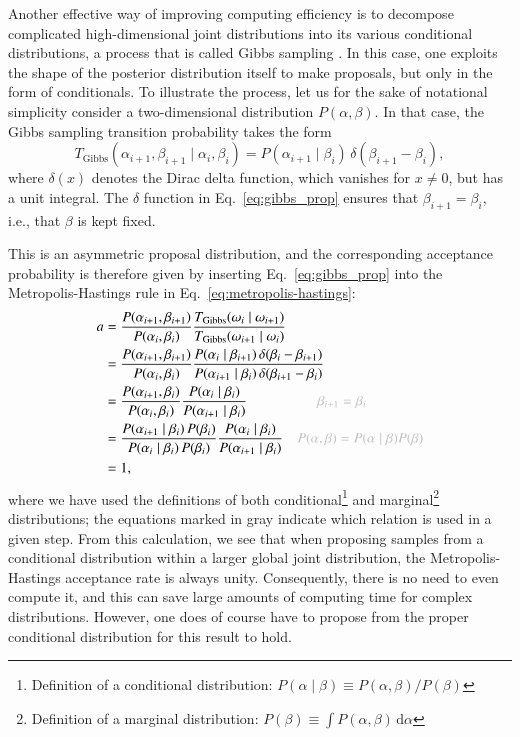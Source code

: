 \documentclass[twocolumn]{aa}
\begin{document}
Another effective way of improving computing efficiency is to decompose
complicated high-dimensional joint distributions into its various
conditional distributions, a process that is called Gibbs sampling
\citep{geman:1984}. In this case, one exploits the shape of the
posterior distribution itself to make proposals, but only in the form
of conditionals. To illustrate the process, let us for the sake of
notational simplicity consider a two-dimensional distribution
$P(\alpha, \beta)$. In that case, the Gibbs sampling transition
probability takes the form
\begin{equation}
  T_{\mathrm{Gibbs}}(\alpha_{i+1}, \beta_{i+1}\mid \alpha_i, \beta_i) =
  P(\alpha_{i+1}\mid \beta_{i})\,\delta(\beta_{i+1}-\beta_i),
  \label{eq:gibbs_prop}
\end{equation}
where $\delta(x)$ denotes the Dirac delta function, which vanishes for
$x\ne 0$, but has a unit integral. The $\delta$ function in
Eq.~\eqref{eq:gibbs_prop} ensures that $\beta_{i+1}=\beta_i$, i.e., that
$\beta$ is kept fixed.


This is an asymmetric proposal distribution, and the corresponding
acceptance probability is therefore given by inserting
Eq.~\eqref{eq:gibbs_prop} into the Metropolis-Hastings rule in
Eq.~\eqref{eq:metropolis-hastings}:
\begin{align}
  a &= \frac{P(\alpha_{i+1}, \beta_{i+1})}{P(\alpha_{i}, \beta_{i})}
  \frac{T_{\mathrm{Gibbs}}(\omega_{i}\mid
    \omega_{i+1})}{T_{\mathrm{Gibbs}}(\omega_{i+1}\mid \omega_i)}\\
  &= 
  \frac{P(\alpha_{i+1}, \beta_{i+1})}{P(\alpha_{i}, \beta_{i})}
  \frac{P(\alpha_{i}\mid
    \beta_{i+1})\,\delta(\beta_{i}-\beta_{i+1})}{P(\alpha_{i+1}\mid \beta_{i})\,\delta(\beta_{i+1}-\beta_i)}\\
  &= 
  \frac{P(\alpha_{i+1}, \beta_{i})}{P(\alpha_{i}, \beta_{i})}
  \frac{P(\alpha_{i}\mid \beta_{i})}{P(\alpha_{i+1}\mid \beta_{i})}\quad \quad\quad\quad\quad{\color{gray}\beta_{i+1}=\beta_i} \\
  &= 
  \frac{P(\alpha_{i+1}\mid \beta_i)\,P(\beta_{i})}{P(\alpha_{i}\mid \beta_{i})\,P(\beta_i)}
  \frac{P(\alpha_{i}\mid \beta_{i})}{P(\alpha_{i+1}\mid \beta_{i})}\quad {\color{gray} P(\alpha,\beta) = P(\alpha\mid\beta)P(\beta)}\\
  &= 1,
\end{align}
where we have used the definitions of both
conditional\footnote{Definition of a conditional distribution: $P(\alpha\mid \beta) \equiv P(\alpha,\beta)/P(\beta)$}
and marginal\footnote{Definition of a marginal distribution: $P(\beta) \equiv \int P(\alpha, \beta)\,\mathrm
  d\alpha$} distributions; the equations marked in gray indicate which
relation is used in a given step. From this calculation, we see that
when proposing samples from a conditional distribution within a larger
global joint distribution, the Metropolis-Hastings acceptance rate is
always unity. Consequently, there is no need to even compute it, and
this can save large amounts of computing time for complex
distributions. However, one does of course have to propose from the
proper conditional distribution for this result to hold.
\end{document}

